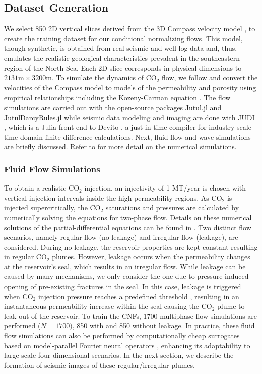 \documentclass{article}
\begin{document}
\subsection{Dataset Generation}
%
We select 850 2D vertical slices derived from the 3D Compass velocity model \cite{BG}, to create the training dataset for our conditional normalizing flows. This model, though synthetic, is obtained from real seismic and well-log data and, thus, emulates the realistic geological characteristics prevalent in the southeastern region of the North Sea. Each 2D slice corresponds in physical dimensions to $2131\mathrm{m}\times 3200\mathrm{m}$. To simulate the dynamics of CO${_2}$ flow, we follow \cite{yin2023solving} and convert the velocities of the Compass model \cite{BG} to models of the permeability and porosity using empirical relationships including the Kozeny-Carman equation \cite{https://doi.org/10.1029/2005GL025134}. The flow simulations are carried out with the open-source packages Jutul.jl \cite{jutul} and JutulDarcyRules.jl \cite{jutuldarcyrules} while seismic data modeling and imaging are done with JUDI \cite{judi}, which is a Julia front-end to Devito \cite{gmd-12-1165-2019, 10.1145/3374916}, a just-in-time compiler for industry-scale time-domain finite-difference calculations. Next, fluid flow and wave simulations are briefly discussed. Refer to \cite{louboutin2023lmi} for more detail on the numerical simulations.
%
\subsubsection{Fluid Flow Simulations}
%
To obtain a realistic CO$_2$ injection, an injectivity of 1 MT/year is chosen with vertical injection intervals inside the high permeability regions. As CO${_2}$ is injected supercritically, the CO$_2$ saturations and pressures are calculated by numerically solving the equations for two-phase flow. Details on these numerical solutions of the partial-differential equations can be found in \cite{RASMUSSEN2021159}. Two distinct flow scenarios, namely regular flow (no-leakage) and irregular flow (leakage), are considered. During no-leakage, the reservoir properties are  kept constant resulting in regular CO${_2}$ plumes. However, leakage occurs when the permeability changes at the reservoir's seal, which results in an irregular flow. While leakage can be caused by many mechanisms, we only consider the one due to pressure-induced opening of pre-existing fractures in the seal. In this case, leakage is triggered when CO${_2}$ injection pressure reaches a predefined threshold \cite{ringrose2020store}, resulting in an instantaneous permeability increase within the seal causing the CO${_2}$ plume to leak out of the reservoir. To train the CNFs, 1700 multiphase flow simulations are performed ($N=1700)$, 850 with and 850 without leakage. In practice, these fluid flow simulations can also be performed by computationally cheap surrogates based on model-parallel Fourier neural operators \cite{grady2023model}, enhancing its adaptability to large-scale four-dimensional scenarios. In the next section, we describe the formation of seismic images of these regular/irregular plumes.
\end{document}
